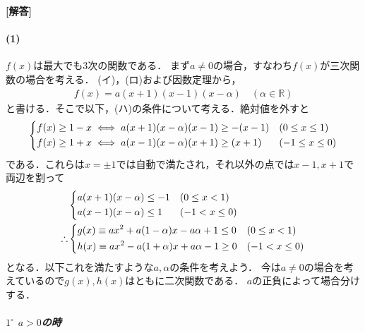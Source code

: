 \documentclass[../../main.tex]{subfiles}
\begin{document}
\begin{oframed}
  
\end{oframed}

{\bf [解答]}
\paragraph{(1)}

$f(x)$は最大でも$3$次の関数である．
まず$a\neq 0$の場合，すなわち$f(x)$が三次関数の場合を考える．
(イ)，(ロ)および因数定理から，
\begin{align}
  f(x) = a(x+1)(x-1)(x-\alpha) \quad (\alpha \in \mathbb{R}) \label{eq:1}
\end{align}
と書ける．そこで以下，(ハ)の条件について考える．絶対値を外すと
\begin{align}
  \begin{dcases}
    f(x) \ge 1 - x \iff a(x+1)(x-\alpha)(x-1) \ge -(x-1) & (0 \le x \le 1) \\
    f(x) \ge 1+x \iff a(x-1)(x-\alpha)(x+1) \ge (x+1)    & (-1 \le x \le 0)
  \end{dcases}
\end{align}
である．これらは$x=\pm 1$では自動で満たされ，それ以外の点では$x-1,x+1$で両辺を割って
\begin{align}
  &
  \begin{dcases}
    a(x+1)(x-\alpha) \le -1 & (0 \le x < 1) \\
    a(x-1)(x-\alpha) \le 1  & (-1 < x \le 0)
  \end{dcases} \\
  \therefore
  &
  \begin{dcases}
    g(x) \equiv a x^2 + a(1-\alpha) x - a\alpha + 1 \le 0 & (0 \le x < 1) \\
    h(x) \equiv a x^2 - a(1+\alpha) x + a\alpha - 1 \ge 0 & (-1 < x \le 0)
  \end{dcases} \label{eq:2}
\end{align}
となる．以下これを満たすような$a,\alpha$の条件を考えよう．
今は$a\neq 0$の場合を考えているので$g(x),h(x)$はともに二次関数である．
$a$の正負によって場合分けする．

\subparagraph{$1^{\circ}$ $a>0$の時}
\end{document}
